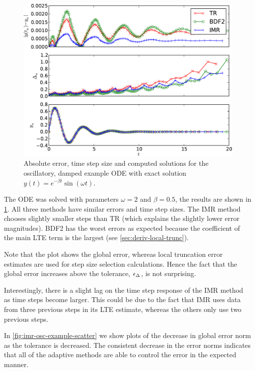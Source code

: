 \begin{figure}
  \centering \includegraphics[width=1\textwidth]{plots/aimr_odes_traces/damped_oscillation-errornormsvs-dtsvs-tracevaluesvstimes}
  \caption{Absolute error, time step size and computed solutions for the oscillatory, damped example ODE with exact solution $y(t) = e^{-\beta t} \sin(\omega t)$.}
  \label{fig:imr-osc-example}
\end{figure}

The ODE was solved with parameters $\omega = 2$ and $\beta = 0.5$, the results are shown in \cref{fig:imr-osc-example}.
All three methods have similar errors and time step sizes.
The IMR method chooses slightly smaller steps than TR (which explains the slightly lower error magnitudes).
BDF2 has the worst errors as expected because the coefficient of the main LTE term is the largest (see \cref{sec:deriv-local-trunc}).

Note that the plot shows the global error, whereas local truncation error estimates are used for step size selection calculations.
Hence the fact that the global error increases above the tolerance, $\epsilon_{\Delta_{}}$, is not surprising.

Interestingly, there is a slight lag on the time step response of the IMR method as time steps become larger.
This could be due to the fact that IMR uses data from three previous steps in its LTE estimate, whereas the others only use two previous steps.

In \cref{fig:imr-osc-example-scatter} we show plots of the decrease in global error norm as the tolerance is decreased.
The consistent decrease in the error norms indicates that all of the adaptive methods are able to control the error in the expected manner.

